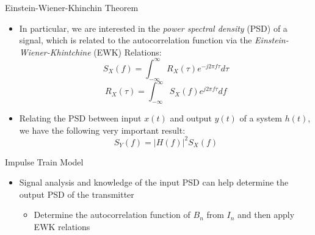\documentclass[10pt]{beamer}
\begin{document}
\begin{frame}[fragile]{Einstein-Wiener-Khinchin Theorem}

    \begin{itemize}
        \item In particular, we are interested in the {\it power spectral density} (PSD) of a signal, which is related to the autocorrelation function via the {\it Einstein-Wiener-Khintchine} (EWK) Relations:
            \begin{equation}
                  S_X(f)=\int_{-\infty}^{\infty}R_X(\tau)e^{-j2\pi{f}{\tau}}d\tau
            \end{equation}
            \begin{equation}                 
                  R_X(\tau)=\int_{-\infty}^{\infty}S_X(f)e^{j2\pi{f}{\tau}}df
            \end{equation} 
        \item Relating the PSD between input $x(t)$ and output $y(t)$ of a system $h(t)$, we have the following very important result:
            \begin{equation}
                  S_Y(f)=|H(f)|^2S_X(f)
            \end{equation}                
    \end{itemize}
\end{frame}

\begin{frame}[fragile]{Impulse Train Model}

    \begin{itemize}
        \item Signal analysis and knowledge of the input PSD can help determine the output PSD of the transmitter 
        \begin{itemize}
            \item Determine the autocorrelation function of $B_n$ from $I_n$ and then apply EWK relations
        \end{itemize}
    \end{itemize}

\end{frame}
\end{document}
